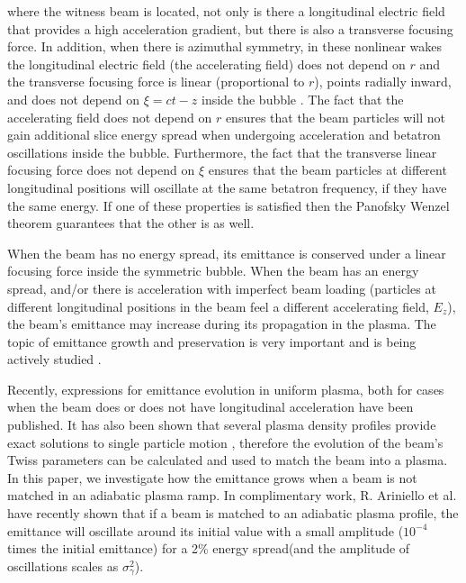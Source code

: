 \documentclass[%
reprint, superscriptaddress,
 amsmath,amssymb, aps,
prstab,
]{revtex4-2}
\begin{document}
where the witness beam is located, not only is there a longitudinal
electric field that provides a high acceleration gradient, but there is also a
transverse focusing force. In addition, when
there is azimuthal symmetry, in these nonlinear wakes the longitudinal electric field (the
accelerating field) does not depend on $r$ and the transverse focusing
force is linear (proportional to $r$), points radially inward, and does not depend on $\xi = ct- z$ inside the bubble \cite{WeiLu2006}. The fact that the accelerating field does not depend on $r$ ensures that the beam particles will not gain additional slice energy spread when undergoing acceleration and betatron oscillations inside the bubble. Furthermore, the fact that the transverse linear focusing force does not depend on $\xi$ ensures that the beam particles at different longitudinal positions will oscillate at the same betatron frequency, if they have the same energy. If one of these properties is satisfied then the Panofsky Wenzel theorem \cite{PWT1,PWT} guarantees that the other is as well.

When the beam has no energy spread, its emittance is conserved under a
linear focusing force inside the symmetric bubble. When the beam has an energy
spread, %
and/or there is acceleration with imperfect beam loading (particles at different
longitudinal positions in the beam feel a different accelerating field,
$E_z$), the beam's emittance may increase during its propagation in the
plasma. 
The topic of emittance growth and preservation  is very important and is being actively studied
 \cite{Mehrling2012,Dornmair,Antici,Migliorati,Xinlu2016,German2018,German2014,Robert}. 



Recently, expressions for emittance evolution in uniform plasma, 
both for cases when the beam does \cite{Xinlu2016} or does not have \cite{German2018}
longitudinal acceleration have been published. It has also been shown that several plasma density profiles provide 
exact solutions to single particle motion \cite{Xinlu2016,German2014}, therefore
the evolution of the beam's Twiss parameters can be calculated and used to match the beam into a plasma.
In this paper,  we investigate how the emittance grows when a beam is not matched in an adiabatic plasma ramp.
In complimentary work, R. Ariniello et al. \cite{Robert} have recently shown that if a beam is matched to an adiabatic plasma profile, the emittance will oscillate around its initial value
with a small amplitude ($10^{-4}$ times the initial emittance) for a 2\% energy spread(and the amplitude of oscillations scales as $\sigma_\gamma^2$). 
\end{document}
